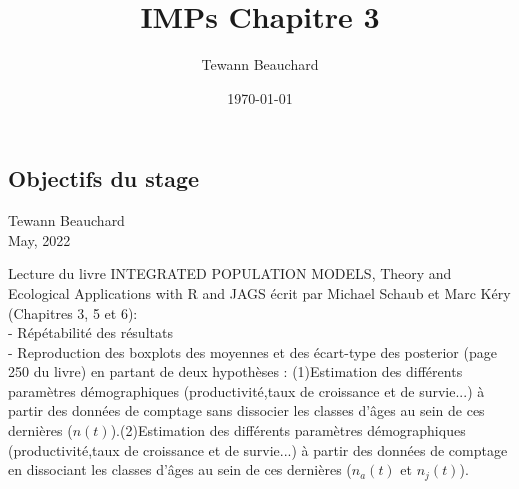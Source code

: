 \documentclass[12pt,a4paper]{article}
\title{IMPs Chapitre 3}
\date{\today}
\author{Tewann Beauchard}
\begin{document}
\begin{center}
\section*{Objectifs du stage}
\vspace*{1cm}
Tewann Beauchard \\
\vspace*{1cm}
May, 2022
\end{center}
\vspace*{1cm}

Lecture du livre INTEGRATED POPULATION MODELS, Theory and Ecological Applications with R and JAGS écrit par Michael Schaub et Marc Kéry (Chapitres 3, 5 et 6): \\
- Répétabilité des résultats\\
- Reproduction des boxplots des moyennes et des écart-type des posterior (page 250 du livre) en partant de deux hypothèses : (1)Estimation des différents paramètres démographiques (productivité,taux de croissance et de survie...) à partir des données de comptage sans dissocier les classes d'âges au sein de ces dernières ($n(t)$).(2)Estimation des différents paramètres démographiques (productivité,taux de croissance et de survie...) à partir des données de comptage en dissociant les classes d'âges au sein de ces dernières ($n_{a}(t)$ et $n_{j}(t)$).\\
\end{document}
